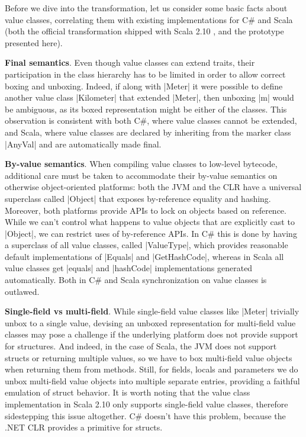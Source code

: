 Before we dive into the transformation, let us consider some basic facts about value classes, correlating them with existing implementations for C\# \cite{dot-net-value-types-www} and Scala (both the official transformation shipped with Scala 2.10 \cite{sip-value-classes}, and the prototype presented here).

\textbf{Final semantics}. Even though value classes can extend traits, their participation in the class hierarchy has to be limited in order to allow correct boxing and unboxing. Indeed, if along with |Meter| it were possible to define another value class |Kilometer| that extended |Meter|, then unboxing |m| would be ambiguous, as its boxed representation might be either of the classes. This observation is consistent with both C\#, where value classes cannot be extended, and Scala, where value classes are declared by inheriting from the marker class |AnyVal| and are automatically made final.

\textbf{By-value semantics}. When compiling value classes to low-level bytecode, additional care must be taken to accommodate their by-value semantics on otherwise object-oriented platforms: both the JVM and the CLR have a universal superclass called |Object| that exposes by-reference equality and hashing. Moreover, both platforms provide APIs to lock on objects based on reference. While we can't control what happens to value objects that are explicitly cast to |Object|, we can restrict uses of by-reference APIs. In C\# this is done by having a superclass of all value classes, called |ValueType|, which provides reasonable default implementations of |Equals| and |GetHashCode|, whereas in Scala all value classes get |equals| and |hashCode| implementations generated automatically. Both in C\# and Scala synchronization on value classes is outlawed.

\textbf{Single-field vs multi-field}. While single-field value clas\-ses like |Meter| trivially unbox to a single value, devising an unboxed representation for multi-field value classes may pose a challenge if the underlying platform does not provide support for structures. And indeed, in the case of Scala, the JVM does not support structs or returning multiple values, so we have to box multi-field value objects when returning them from methods. Still, for fields, locals and parameters we do unbox multi-field value objects into multiple separate entries, providing a faithful emulation of struct behavior. It is worth noting that the value class implementation in Scala 2.10 only supports single-field value classes, therefore sidestepping this issue altogether. C\# doesn't have this problem, because the .NET CLR provides a primitive for structs.

